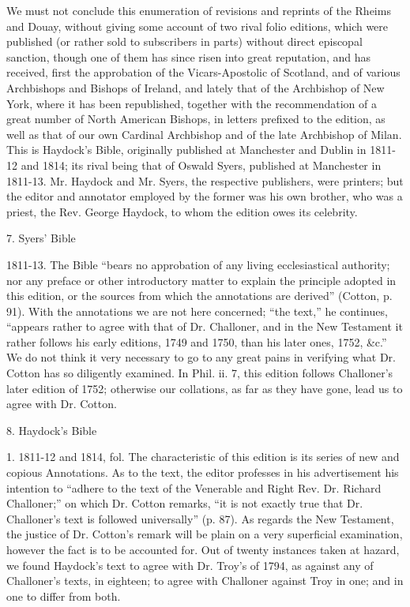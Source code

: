 We must not conclude this enumeration of revisions and reprints of
the Rheims and Douay, without giving some account of two rival folio
editions, which were published (or rather sold to subscribers in
parts) without direct episcopal sanction, though one of them has since
risen into great reputation, and has received, first the approbation
of the Vicars-Apostolic of Scotland, and of various Archbishops and
Bishops of Ireland, and lately that of the Archbishop of New York,
where it has been republished, together with the recommendation of a
great number of North American Bishops, in letters prefixed to the
edition, as well as that of our own Cardinal Archbishop and of the
late Archbishop of Milan. This is Haydock's Bible, originally
published at Manchester and Dublin in 1811-12 and 1814; its rival
being that of Oswald Syers, published at Manchester in 1811-13. Mr.
Haydock and Mr. Syers, the respective publishers, were printers; but
the editor and annotator employed by the former was his own brother,
who was a priest, the Rev. George Haydock, to whom the edition owes
its celebrity.

7. Syers' Bible

1811-13. The Bible ``bears no approbation of any living
ecclesiastical authority; nor any preface or other introductory matter
to explain the principle adopted in this edition, or the sources from
which the annotations are derived'' (Cotton, p. 91). With the
annotations we are not here concerned; ``the text,'' he
continues, ``appears rather to agree with that of Dr. Challoner,
and in the New Testament it rather follows his early editions, 1749
and 1750, than his later ones, 1752, \&c.'' We do not think it
very necessary to go to any great pains in verifying what Dr. Cotton
has so diligently examined. In Phil. ii. 7, this edition follows
Challoner's later edition of 1752; otherwise our collations, as far as
they have gone, lead us to agree with Dr. Cotton.

8. Haydock's Bible

1. 1811-12 and 1814, fol. The characteristic of this edition is its
series of new and copious Annotations. As to the text, the editor
professes in his advertisement his intention to ``adhere to the
text of the Venerable and Right Rev. Dr. Richard Challoner;'' on
which Dr. Cotton remarks, ``it is not exactly true that Dr.
Challoner's text is followed universally'' (p. 87). As regards
the New Testament, the justice of Dr. Cotton's remark will be plain on
a very superficial examination, however the fact is to be
accounted for. Out of twenty instances taken at hazard, we found
Haydock's text to agree with Dr. Troy's of 1794, as against any of
Challoner's texts, in eighteen; to agree with Challoner against Troy
in one; and in one to differ from both.

